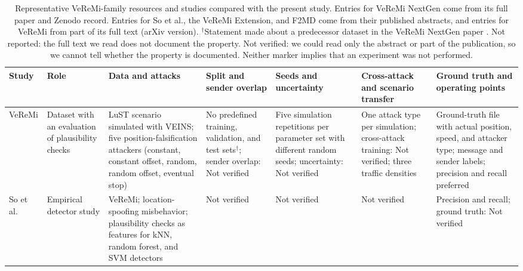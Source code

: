 \documentclass[preprint,12pt,numafflabel]{elsarticle}
\newlength{\relatedcolw}
\begin{document}
\setlength{\relatedcolw}{\dimexpr 0.98\textheight - 49pt\relax}
\begin{table}
\centering
\caption{Representative VeReMi-family resources and studies compared with the present study. Entries for VeReMi NextGen come from its full paper and Zenodo record. Entries for So et al., the VeReMi Extension, and F2MD come from their published abstracts, and entries for VeReMi from part of its full text (arXiv version). $^\dagger$Statement made about a predecessor dataset in the VeReMi NextGen paper \cite{hermann2026veremi}. Not reported: the full text we read does not document the property. Not verified: we could read only the abstract or part of the publication, so we cannot tell whether the property is documented. Neither marker implies that an experiment was not performed.}
\label{tab:related}
{\scriptsize\setlength{\tabcolsep}{3.5pt}\renewcommand{\arraystretch}{1.12}
\begin{tabular}{>{\raggedright\arraybackslash}p{0.09\relatedcolw}>{\raggedright\arraybackslash}p{0.12\relatedcolw}>{\raggedright\arraybackslash}p{0.20\relatedcolw}>{\raggedright\arraybackslash}p{0.16\relatedcolw}>{\raggedright\arraybackslash}p{0.12\relatedcolw}>{\raggedright\arraybackslash}p{0.14\relatedcolw}>{\raggedright\arraybackslash}p{0.17\relatedcolw}}
\toprule
Study & Role & Data and attacks & Split and sender overlap & Seeds and uncertainty & Cross-attack and scenario transfer & Ground truth and operating points \\
\midrule
VeReMi \cite{vanderheijden2018veremi} & Dataset with an evaluation of plausibility checks & LuST scenario simulated with VEINS; five position-falsification attackers (constant, constant offset, random, random offset, eventual stop) & No predefined training, validation, and test sets$^\dagger$; sender overlap: Not verified & Five simulation repetitions per parameter set with different random seeds; uncertainty: Not verified & One attack type per simulation; cross-attack training: Not verified; three traffic densities & Ground-truth file with actual position, speed, and attacker type; message and sender labels; precision and recall preferred \\
So et al.\ \cite{so2018plausibility} & Empirical detector study & VeReMi; location-spoofing misbehavior; plausibility checks as features for kNN, random forest, and SVM detectors & Not verified & Not verified & Not verified & Precision and recall; ground truth: Not verified \\

\end{tabular}}
\end{table}
\end{document}
